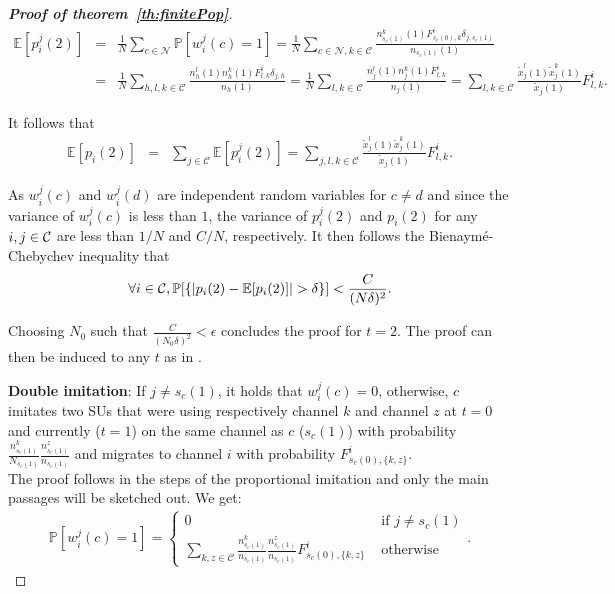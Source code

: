 \documentclass[12pt, onecolumn]{IEEEtran}
\theoremstyle{plain}
\theoremstyle{definition}
\begin{document}
\begin{proof}[\textbf{Proof of theorem~\ref{th:finitePop}}]
\begin{eqnarray*}
\mathbb{E}[p_i^j(2)] &=& \frac{1}{N}\sum_{c\in \mathcal{N}}\mathbb{P}[w_i^j(c)=1] = \frac{1}{N}\sum_{c\in \mathcal{N},k\in \mathcal{C}} \frac{n_{s_c(1)}^k(1) F_{s_c(0),k}^i\delta_{j,s_c(1)}}{n_{s_c(1)}(1)} \\
&=&\frac{1}{N}\sum_{h,l,k\in \mathcal{C}} \frac{n_h^l(1)n_h^k(1)F_{l,k}^{i}\delta_{j,h}}{n_h(1)} = \frac{1}{N}\sum_{l,k\in \mathcal{C}} \frac{n_j^l(1)n_j^k(1)F_{l,k}^{i}}{n_j(1)} = \sum_{l,k\in \mathcal{C}} \frac{\tilde{x}_j^l(1)\tilde{x}_j^k(1)}{\tilde{x}_j(1)}F_{l,k}^{i}.
\end{eqnarray*}

It follows that
\begin{eqnarray*}
\mathbb{E}[p_i(2)]&=&\sum_{j \in \mathcal{C}}\mathbb{E}[p_i^j(2)] = \sum_{j,l,k \in \mathcal{C}} \frac{\tilde{x}_j^l(1)\tilde{x}_j^k(1)}{\tilde{x}_j(1)}F_{l,k}^{i}.
\end{eqnarray*}




As $w_i^j(c)$ and $w_i^j(d)$ are independent random variables for $c\neq d$ and since the variance of $w_i^j(c)$ is less than $1$, the variance of $p_i^j(2)$ and $p_i(2)$ for any $i,j\in{\cal C}$ are less than $1/N$ and $C/N$, respectively. It then follows the Bienaym\'e-Chebychev inequality that
\begin{equation*}
\forall i\in{\cal C}, \mathbb{P}[  \{ | p_i(2)-\mathbb{E}[p_i(2)] | > \delta  \} ] < \frac{C}{(N\delta)^2}.
\end{equation*}


Choosing $N_{0}$ such that $\frac{C}{(N_0\delta)^2}<\epsilon$ concludes the proof for $t=2$.
The proof can then be induced to any $t$ as in \cite{Schlag96}.

{\bf Double imitation}: If $j\neq s_c(1)$, it holds that $w_i^j(c)=0$, otherwise, $c$ imitates two SUs that were using respectively channel $k$ and channel $z$ at $t=0$ and currently ($t=1$) on the same channel as $c$ ($s_c(1)$) with
probability $\frac{n_{s_c(1)}^k}{N_{s_c(1)}}\frac{n_{s_c(1)}^{z}}{n_{s_c(1)}}$ and migrates to channel $i$ with probability $F_{s_c(0),\{k,z\}}^{i}$.\\
The proof follows in the steps of the proportional imitation and only the main passages will be sketched out. We get:
\begin{eqnarray*}
\mathbb{P}[w_i^j(c)=1] =
\begin{cases}
0 & \mbox{ if } j\neq s_c(1) \\
\displaystyle \sum_{k,z\in \mathcal{C}} \frac{n_{s_c(1)}^{k}}{n_{s_c(1)}}\frac{n_{s_c(1)}^{z}}{n_{s_c(1)}}F_{s_c(0),\{k,z\}}^{i}  & \mbox{ otherwise}
\end{cases}.
\end{eqnarray*}


\end{proof}
\end{document}
